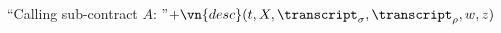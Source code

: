 \begin{algorithmic}
    \State \Return ``Calling sub-contract $A$: ''$+ \vn{desc}(t, X,
      \transcript_\sigma, \transcript_\rho, w, z)$
  \EndFunction
\end{algorithmic}
